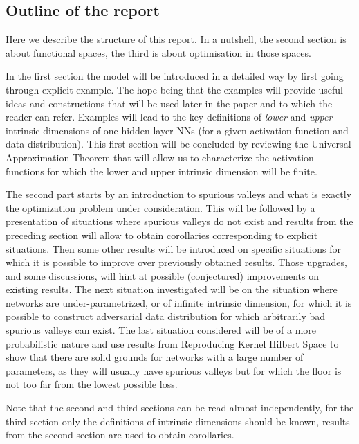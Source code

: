 \documentclass[11pt]{article} %
\begin{document}
\subsection{Outline of the report}
	Here we describe the structure of this report. In a nutshell, the second section is about functional spaces, the third is about optimisation in those spaces.
	\par
In the first section the model will be introduced in a detailed way by first going through explicit example. The hope being that the examples will provide useful ideas and constructions that will be used later in the paper and to which the reader can refer. Examples will lead to the key definitions of \emph{lower} and \emph{upper} intrinsic dimensions of one-hidden-layer NNs (for a given activation function and data-distribution).
	\newline
	This first section will be concluded by reviewing the Universal Approximation Theorem that will allow us to characterize the activation functions for which the lower and upper intrinsic dimension will be finite.
	\par
	The second part starts by an introduction to spurious valleys and what is exactly the optimization problem under consideration. This will be followed by a presentation of situations where spurious valleys do not exist and results from the preceding section will allow to obtain corollaries corresponding to explicit situations. Then some other results will be introduced on specific situations for which it is possible to improve over previously obtained results. Those upgrades, and some discussions, will hint at possible (conjectured) improvements on existing results.
	\newline
	The next situation investigated will be on the situation where networks are under-parametrized, or of infinite intrinsic dimension, for which it is possible to construct adversarial data distribution for which arbitrarily bad spurious valleys can exist.
	\newline
	The last situation considered will be of a more probabilistic nature and use results from Reproducing Kernel Hilbert Space to show that there are solid grounds for networks with a large number of parameters, as they will usually have spurious valleys but for which the floor is not too far from the lowest possible loss. 
	\par Note that the second and third sections can be read almost independently, for the third section only the definitions of intrinsic dimensions should be known, results from the second section are used to obtain corollaries. 
\end{document}
